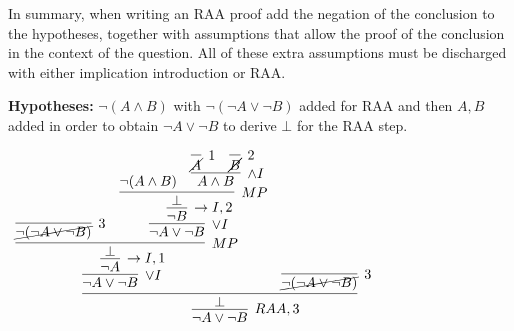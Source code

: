 \documentclass[11pt]{report}
\begin{document}
\begin{enumerate}
	In summary, when writing an RAA proof add the negation of the conclusion to the hypotheses, together with assumptions that allow the proof of the conclusion in the context of the question. All of these extra assumptions must be discharged with either implication introduction or RAA. 

	{\bf Hypotheses:} $\lnot (A \land B)$ with $\lnot(\lnot A \lor \lnot B)$ added for RAA and then $A,B$ added in order to obtain $\lnot A \lor \lnot B$ to derive $\bot$ for the RAA step. 

	\begin{mdframed}
		\begin{center}
			$\begin{array}{c}
				\infer[RAA,3]{\lnot A \lor \lnot B}
					{\infer[]{\bot}
						{\infer[\lor I]{\lnot A \lor \lnot B}
							{\infer[\to I,1]{\lnot A}
								{\infer[MP]{\bot}
									{\infer[3]{\cancel{\lnot(\lnot A \lor \lnot B)}}
										{}
									&
									\infer[\lor I]{\lnot A \lor \lnot B}
										{\infer[\to I,2]{\lnot B}
											{\infer[MP]{\bot}
												{\lnot(A \land B)
												&
												\infer[\land I]{A \land B}
													{\infer[1]{\cancel{A}}{}
													&
													\infer[2]{\cancel{B}}{}}}}}}}}
						&
						\infer[3]{\cancel{\lnot(\lnot A \lor \lnot B)}}{}}}
			\end{array}$
		\end{center}
	\end{mdframed}
	
\end{enumerate}
\end{document}
